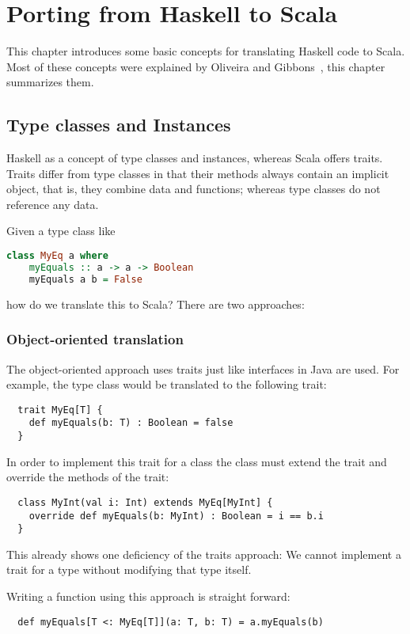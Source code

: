 \chapter{Porting from Haskell to Scala}

This chapter introduces some basic concepts for translating Haskell code
to Scala. Most of these concepts were explained by Oliveira and Gibbons~\cite{scalagp}, this
chapter summarizes them.

\section{Type classes and Instances}

Haskell as a concept of type classes and instances, whereas Scala offers
traits. Traits differ from type classes in that their methods always contain
an implicit  object, that is, they combine data and functions;
whereas type classes do not reference any data.

Given a type class like
\begin{lstlisting}[language=Haskell]
  class MyEq a where
    myEquals :: a -> a -> Boolean
    myEquals a b = False
\end{lstlisting}
how do we translate this to Scala? There are two approaches:

\subsection{Object-oriented translation}
The object-oriented approach uses traits just like interfaces in
Java are used. For example, the  type class would be translated
to the following trait:
\begin{lstlisting}
  trait MyEq[T] {
    def myEquals(b: T) : Boolean = false
  }
\end{lstlisting}
In order to implement this trait for a class the class must extend the
trait and override the methods of the trait:
\begin{lstlisting}
  class MyInt(val i: Int) extends MyEq[MyInt] {
    override def myEquals(b: MyInt) : Boolean = i == b.i
  }
\end{lstlisting}
This already shows one deficiency of the traits approach: We cannot
implement a trait for a type without modifying that type itself.

Writing a function using this approach is straight forward:
\begin{lstlisting}
  def myEquals[T <: MyEq[T]](a: T, b: T) = a.myEquals(b)
\end{lstlisting}

